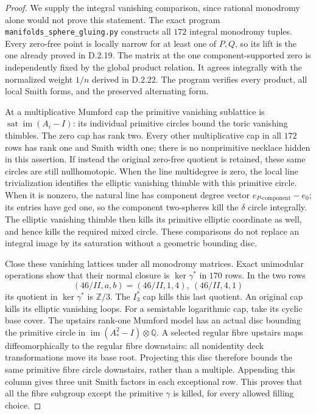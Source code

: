 \begin{proof}
We supply the integral vanishing comparison, since rational monodromy
alone would not prove this statement. The exact program
\texttt{manifolds\_sphere\_gluing.py} constructs all $172$ integral
monodromy tuples. Every zero-free point is locally narrow for at least
one of $P,Q$, so its lift is the one already proved in D.2.19.
The matrix at the one component-supported zero is independently fixed
by the global product relation. It agrees integrally with the normalized
weight $1/n$ derived in D.2.22. The program verifies every product,
all local Smith forms, and the preserved alternating form.

At a multiplicative Mumford cap the primitive vanishing sublattice is
$\operatorname{sat}\operatorname{im}(A_i-I)$: its individual primitive
circles bound the toric vanishing thimbles. The zero cap has rank two.
Every other multiplicative cap in all $172$ rows has rank one and
Smith width one; there is no nonprimitive necklace hidden in this
assertion. If instead the original zero-free quotient is retained,
these same circles are still nullhomotopic. When the line multidegree
is zero, the local line trivialization identifies the elliptic vanishing
thimble with this primitive circle. When it is nonzero, the natural
line has component degree vector $e_{P\text{-component}}-e_0$;
its entries have gcd one, so the component two-spheres kill the
$\delta$ circle integrally. The elliptic vanishing thimble then kills
its primitive elliptic coordinate as well, and hence kills the required
mixed circle. These comparisons do not replace an integral image by
its saturation without a geometric bounding disc.

Close these vanishing lattices under all monodromy matrices. Exact
unimodular operations show that their normal closure is
$\ker\gamma^*$ in $170$ rows. In the two rows
\[
 (46/II,a,b)=(46/II,1,4),\ (46/II,4,1)
\]
its quotient in $\ker\gamma^*$ is $\mathbb Z/3$. The $I_3^*$ cap
kills this last quotient. An original cap kills its elliptic vanishing
loops. For a semistable logarithmic cap, take its cyclic base cover.
The upstairs rank-one Mumford model has an actual disc bounding the
primitive circle in $\operatorname{im}(A_*^2-I)\otimes\mathbb Q$.
A selected regular fibre upstairs maps diffeomorphically to the
regular fibre downstairs: all nonidentity deck transformations move
its base root. Projecting this disc therefore bounds the same primitive
fibre circle downstairs, rather than a multiple. Appending this column
gives three unit Smith factors in each exceptional row. This proves
that all the fibre subgroup except the primitive $\gamma$ is killed,
for every allowed filling choice.


\end{proof}
